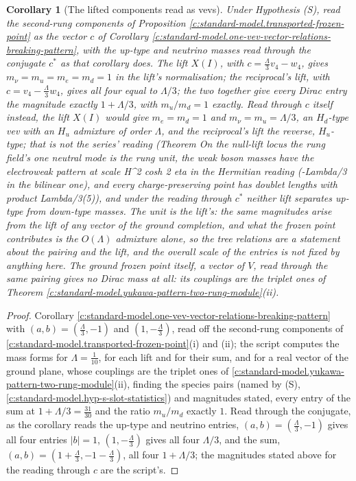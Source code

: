 \documentclass[11pt]{article}
\newtheorem{corollary}[theorem]{Corollary}
\theoremstyle{definition}
\theoremstyle{plain}
\newcommand{\changedmark}[2]{\marginpar{\raggedright\scriptsize\color{#1}#2}}
\begin{document}
\begin{corollary}[The lifted components read as vevs]\label{c:standard-model.lifted-components-read-vevs}
\changedmark{BurntOrange}{changed since the deposit}
Under Hypothesis (S), read the second-rung components of Proposition \ref{c:standard-model.transported-frozen-point} as the vector $c$ of Corollary \ref{c:standard-model.one-vev-vector-relations-breaking-pattern}, with the up-type and neutrino masses read through the conjugate $c^{*}$ as that corollary does. The lift $X(I)$, with $c = \tfrac{\Lambda}{3}v_{4} - w_{4}$, gives $m_{\nu} = m_{u} = m_{e} = m_{d} = 1$ in the lift's normalisation; the reciprocal's lift, with $c = v_{4} - \tfrac{\Lambda}{3}w_{4}$, gives all four equal to $\Lambda/3$; the two together give every Dirac entry the magnitude exactly $1 + \Lambda/3$, with $m_{u}/m_{d} = 1$ exactly. Read through $c$ itself instead, the lift $X(I)$ would give $m_{e} = m_{d} = 1$ and $m_{\nu} = m_{u} = \Lambda/3$, an $H_{d}$-type vev with an $H_{u}$ admixture of order $\Lambda$, and the reciprocal's lift the reverse, $H_{u}$-type; that is not the series' reading (Theorem \emph{On the null-lift locus the rung field's one neutral mode is the rung unit, the weak boson masses have the electroweak pattern at scale H\^{}2 cosh 2 eta in the Hermitian reading (-Lambda/3 in the bilinear one), and every charge-preserving point has doublet lengths with product Lambda/3}(5)), and under the reading through $c^{*}$ neither lift separates up-type from down-type masses. The unit is the lift's: the same magnitudes arise from the lift of any vector of the ground completion, and what the frozen point contributes is the $O(\Lambda)$ admixture alone, so the tree relations are a statement about the pairing and the lift, and the overall scale of the entries is not fixed by anything here. The ground frozen point itself, a vector of $V$, read through the same pairing gives no Dirac mass at all: its couplings are the triplet ones of Theorem \ref{c:standard-model.yukawa-pattern-two-rung-module}(ii).
\end{corollary}
\begin{proof}
Corollary \ref{c:standard-model.one-vev-vector-relations-breaking-pattern} with $(a, b) = (\tfrac{\Lambda}{3}, -1)$ and $(1, -\tfrac{\Lambda}{3})$, read off the second-rung components of \ref{c:standard-model.transported-frozen-point}(i) and (ii); the script computes the mass forms for $\Lambda = \tfrac{1}{10}$, for each lift and for their sum, and for a real vector of the ground plane, whose couplings are the triplet ones of \ref{c:standard-model.yukawa-pattern-two-rung-module}(ii), finding the species pairs (named by (S), \ref{c:standard-model.hyp-s-slot-statistics}) and magnitudes stated, every entry of the sum at $1 + \Lambda/3 = \tfrac{31}{30}$ and the ratio $m_{u}/m_{d}$ exactly $1$. Read through the conjugate, as the corollary reads the up-type and neutrino entries, $(a, b) = (\tfrac{\Lambda}{3}, -1)$ gives all four entries $|b| = 1$, $(1, -\tfrac{\Lambda}{3})$ gives all four $\Lambda/3$, and the sum, $(a, b) = (1 + \tfrac{\Lambda}{3}, -1 - \tfrac{\Lambda}{3})$, all four $1 + \Lambda/3$; the magnitudes stated above for the reading through $c$ are the script's.

\end{proof}
\end{document}
